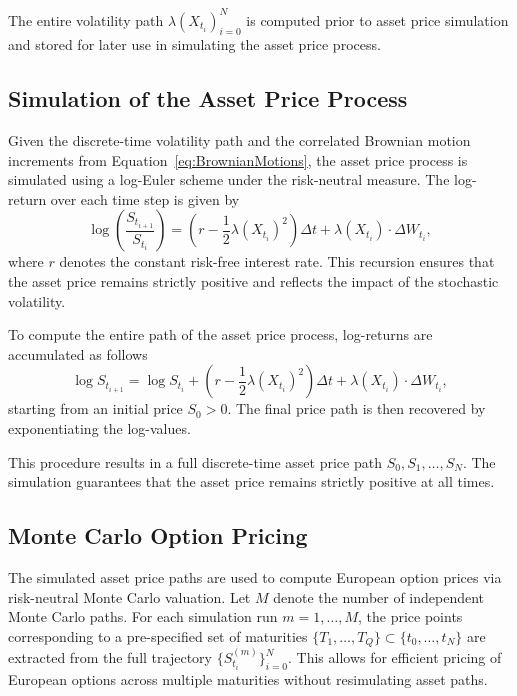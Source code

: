 The entire volatility path ${\lambda(X_{t_i})}_{i=0}^N$ is computed prior to asset price simulation and stored for later use in simulating the asset price process.


\subsection{Simulation of the Asset Price Process} \label{subsec:SimAssetPriceProcess}

Given the discrete-time volatility path and the correlated Brownian motion increments from Equation~\eqref{eq:BrownianMotions}, the asset price process is simulated using a log-Euler scheme under the risk-neutral measure. The log-return over each time step is given by
\begin{equation} \label{eq:TimeDiscrLogReturn}
    \log\left( \frac{S_{t_{i+1}}}{S_{t_i}} \right) = \left( r - \frac{1}{2} \lambda(X_{t_i})^2 \right) \Delta t + \lambda(X_{t_i}) \cdot \Delta W_{t_i},
\end{equation}
where $r$ denotes the constant risk-free interest rate. This recursion ensures that the asset price remains strictly positive and reflects the impact of the stochastic volatility.

To compute the entire path of the asset price process, log-returns are accumulated as follows
\begin{equation} \label{eq:TimeDiscrLogPrice}
    \log S_{t_{i+1}} = \log S_{t_i} + \left( r - \frac{1}{2} \lambda(X_{t_i})^2 \right) \Delta t + \lambda(X_{t_i}) \cdot \Delta W_{t_i},
\end{equation}
starting from an initial price $S_0 > 0$. The final price path is then recovered by exponentiating the log-values.

This procedure results in a full discrete-time asset price path $S_0, S_1, \ldots, S_N$. The simulation guarantees that the asset price remains strictly positive at all times.


\subsection{Monte Carlo Option Pricing} \label{subsec:MonteCarloOptionPricing}

The simulated asset price paths are used to compute European option prices via risk-neutral Monte Carlo valuation. Let $M$ denote the number of independent Monte Carlo paths. For each simulation run $m = 1, \ldots, M$, the price points corresponding to a pre-specified set of maturities $\{T_1,\ldots,T_Q\} \subset \{t_0,\ldots,t_N\}$ are extracted from the full trajectory $\{S_{t_i}^{(m)}\}_{i=0}^N$. This allows for efficient pricing of European options across multiple maturities without resimulating asset paths.

